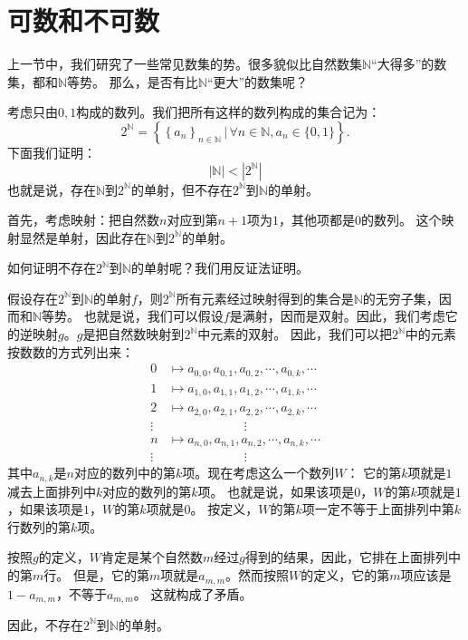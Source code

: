 \documentclass[12pt,UTF8,fontset=none]{ctexbook}
\begin{document}
\section{可数和不可数}
上一节中，我们研究了一些常见数集的势。很多貌似比自然数集$\mathbb{N}$“大得多”的数集，都和$\mathbb{N}$等势。
那么，是否有比$\mathbb{N}$“更大”的数集呢？

考虑只由$0,1$构成的数列。我们把所有这样的数列构成的集合记为：
$$ 2^\mathbb{N} = \left\{\left\{a_n\right\}_{n\in\mathbb{N}} \, | \, \forall n\in\mathbb{N}, a_n \in \{0, 1\} \right\}. $$
下面我们证明：
$$|\mathbb{N}| < |2^\mathbb{N}|$$
也就是说，存在$\mathbb{N}$到$2^\mathbb{N}$的单射，但不存在$2^\mathbb{N}$到$\mathbb{N}$的单射。

首先，考虑映射：把自然数$n$对应到第$n+1$项为$1$，其他项都是$0$的数列。
这个映射显然是单射，因此存在$\mathbb{N}$到$2^\mathbb{N}$的单射。

如何证明不存在$2^\mathbb{N}$到$\mathbb{N}$的单射呢？我们用反证法证明。

假设存在$2^\mathbb{N}$到$\mathbb{N}$的单射$f$，则$2^\mathbb{N}$所有元素经过映射得到的集合是$\mathbb{N}$的无穷子集，因而和$\mathbb{N}$等势。
也就是说，我们可以假设$f$是满射，因而是双射。因此，我们考虑它的逆映射$g$。$g$是把自然数映射到$2^\mathbb{N}$中元素的双射。
因此，我们可以把$2^\mathbb{N}$中的元素按数数的方式列出来：
\begin{align*}
    0 &\mapsto a_{0,0}, a_{0,1}, a_{0,2}, \cdots , a_{0,k}, \cdots  \\
    1 &\mapsto a_{1,0}, a_{1,1}, a_{1,2}, \cdots , a_{1,k}, \cdots  \\
    2 &\mapsto a_{2,0}, a_{2,1}, a_{2,2}, \cdots , a_{2,k}, \cdots  \\
    \vdots & \qquad \qquad\qquad \vdots  \\
    n &\mapsto a_{n,0}, a_{n,1}, a_{n,2}, \cdots , a_{n,k}, \cdots  \\
    \vdots & \qquad \qquad\qquad \vdots  
\end{align*}
其中$a_{n,k}$是$n$对应的数列中的第$k$项。现在考虑这么一个数列$W$：
它的第$k$项就是$1$减去上面排列中$k$对应的数列的第$k$项。
也就是说，如果该项是$0$，$W$的第$k$项就是$1$，如果该项是$1$，$W$的第$k$项就是$0$。
按定义，$W$的第$k$项一定不等于上面排列中第$k$行数列的第$k$项。

按照$g$的定义，$W$肯定是某个自然数$m$经过$g$得到的结果，因此，它排在上面排列中的第$m$行。
但是，它的第$m$项就是$a_{m,m}$。然而按照$W$的定义，它的第$m$项应该是$1 - a_{m,m}$，不等于$a_{m,m}$。
这就构成了矛盾。

因此，不存在$2^\mathbb{N}$到$\mathbb{N}$的单射。
\end{document}
